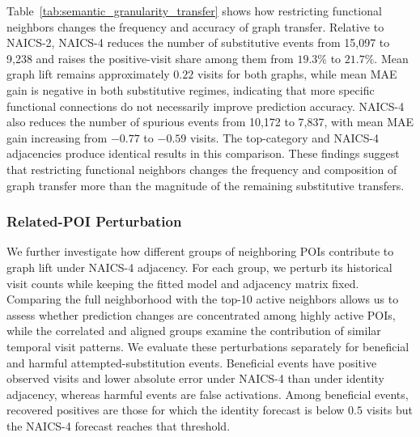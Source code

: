 \documentclass[preprint,authoryear,11pt]{elsarticle}
\theoremstyle{definition}
\begin{document}
Table~\ref{tab:semantic_granularity_transfer} shows how restricting functional neighbors changes the frequency and accuracy of graph transfer.
Relative to NAICS-2, NAICS-4 reduces the number of substitutive events from 15,097 to 9,238 and raises the positive-visit share among them from \(19.3\%\) to \(21.7\%\).
Mean graph lift remains approximately \(0.22\) visits for both graphs, while mean MAE gain is negative in both substitutive regimes, indicating that more specific functional connections do not necessarily improve prediction accuracy.
NAICS-4 also reduces the number of spurious events from 10,172 to 7,837, with mean MAE gain increasing from \(-0.77\) to \(-0.59\) visits.
The top-category and NAICS-4 adjacencies produce identical results in this comparison.
These findings suggest that restricting functional neighbors changes the frequency and composition of graph transfer more than the magnitude of the remaining substitutive transfers.

\subsubsection{Related-POI Perturbation}
\label{subsubsec:perturbation_results}

We further investigate how different groups of neighboring POIs contribute to graph lift under NAICS-4 adjacency.
For each group, we perturb its historical visit counts while keeping the fitted model and adjacency matrix fixed.
Comparing the full neighborhood with the top-10 active neighbors allows us to assess whether prediction changes are concentrated among highly active POIs, while the correlated and aligned groups examine the contribution of similar temporal visit patterns.
We evaluate these perturbations separately for beneficial and harmful attempted-substitution events.
Beneficial events have positive observed visits and lower absolute error under NAICS-4 than under identity adjacency, whereas harmful events are false activations.
Among beneficial events, recovered positives are those for which the identity forecast is below \(0.5\) visits but the NAICS-4 forecast reaches that threshold.
\end{document}
